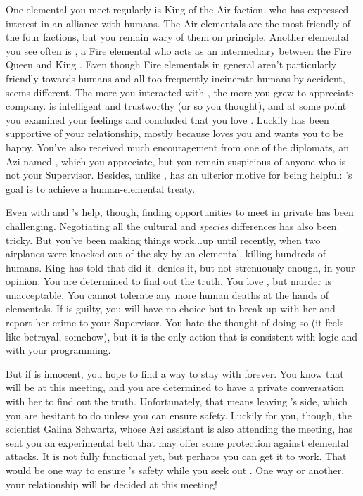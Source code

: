 \documentclass[char]{elementals}
\begin{document}
One elemental you meet regularly is King \cKing{\intro} of the Air faction, who has expressed interest in an alliance with humans.  The Air elementals are the most friendly of the four factions, but you remain wary of them on principle.  Another elemental you see often is \cJuliet{\intro}, a Fire elemental who acts as an intermediary between the Fire Queen \cQueen{\intro} and King \cKing{}.  Even though Fire elementals in general aren't particularly friendly towards humans and all too frequently incinerate humans by accident, \cJuliet{} seems different.  The more you interacted with \cJuliet{\them}, the more you grew to appreciate \cJuliet{\their} company.  \cJuliet{\They} is intelligent and trustworthy (or so you thought), and at some point you examined your feelings and concluded that you love \cJuliet{\them}.  Luckily \cLeader{} has been supportive of your relationship, mostly because \cLeader{\they} loves you and wants you to be happy.  You've also received much encouragement from one of the diplomats, an Azi named \cDiplomat{\intro}, which you appreciate, but you remain suspicious of anyone who is not your Supervisor.  Besides, unlike \cLeader{}, \cDiplomat{\they} has an ulterior motive for being helpful: \cDiplomat{}'s goal is to achieve a human-elemental treaty.

Even with \cLeader{} and \cDiplomat{}'s help, though, finding opportunities to meet \cJuliet{} in private has been challenging.  Negotiating all the cultural and \emph{species} differences has also been tricky.   But you've been making things work...up until recently, when two airplanes were knocked out of the sky by an elemental, killing hundreds of humans.  King \cKing{} has told \cLeader{} that \cJuliet{} did it.  \cJuliet{\They} denies it, but not strenuously enough, in your opinion.  You are determined to find out the truth.  You love \cJuliet{\them}, but murder is unacceptable.  You cannot tolerate any more human deaths at the hands of elementals.  If \cJuliet{\they} is guilty, you will have no choice but to break up with her and report her crime to your Supervisor.  You hate the thought of doing so (it feels like betrayal, somehow), but it is the only action that is consistent with logic and with your programming.

But if \cJuliet{\they} is innocent, you hope to find a way to stay with \cJuliet{\them} forever.  You know that \cJuliet{\they} will be at this meeting, and you are determined to have a private conversation with her to find out the truth.  Unfortunately, that means leaving \cLeader{}'s side, which you are hesitant to do unless you can ensure \cLeader{\their} safety.  Luckily for you, though, the scientist Galina Schwartz, whose Azi assistant \cScientist{\intro} is also attending the meeting, has sent you an experimental belt that may offer some protection against elemental attacks.  It is not fully functional yet, but perhaps you can get it to work.  That would be one way to ensure \cLeader{}'s safety while you seek out \cJuliet{}.  One way or another, your relationship will be decided at this meeting!
\end{document}
